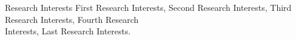 
\begin{rubric}{Research Interests}
    First Research Interests,
    Second Research Interests,
    Third Research Interests,
    Fourth Research \\Interests,
    Last Research Interests.
\end{rubric}

